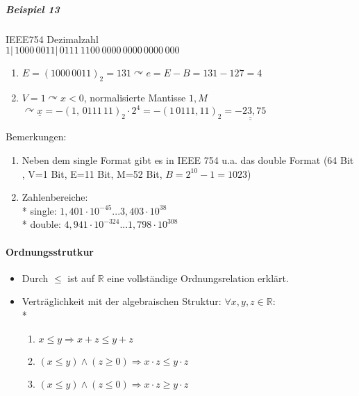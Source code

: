 \documentclass[a4paper]{scrartcl}
\begin{document}
\subparagraph{Beispiel 13} IEEE754 Dezimalzahl\\
$1| \, 1000 \, 0011|\, 0111 \, 1100 \, 0000 \, 0000 \, 0000 \, 000$
\begin{enumerate}
\item $E=(1000 \, 0011)_2 = 131 \curvearrowright e=E-B = 131 - 127=4$
\item $V=1 \curvearrowright x < 0$, normalisierte Mantisse $1,M$\\
$\curvearrowright \underline{x} = -(1,\, 0111 \, 11)_2 \cdot 2^4= -(1 \, 0111, 11)_2 = \underline{\underline{-23,75}}$
\end{enumerate}

Bemerkungen:
\begin{enumerate}
\item Neben dem single Format gibt es in IEEE 754 u.a. das double Format (64 Bit , V=1 Bit, E=11 Bit, M=52 Bit, $B=2^{10} -1 = 1023$)
\item Zahlenbereiche:\\*
single: $1,401 \cdot 10^{-45} ... 3,403 \cdot 10^{38}$\\*
double: $4,941 \cdot 10^{-324} ... 1,798 \cdot 10^{308}$
\end{enumerate}

\paragraph{Ordnungsstrutkur}
\begin{itemize}
\item Durch $\leq$ ist auf $\mathbb{R}$ eine vollständige Ordnungsrelation erklärt.
\item Verträglichkeit mit der algebraischen Struktur: $\forall x,y,z \in \mathbb{R}:$\\*
\begin{enumerate}
\item $x \leq y \Rightarrow x + z \leq y + z$
\item $(x \leq y) \wedge (z \geq 0) \Rightarrow x \cdot z \leq y \cdot z$
\item $(x \leq y) \wedge (z \leq 0 ) \Rightarrow x \cdot z \geq y \cdot z$

\end{enumerate}
\end{itemize}
\end{document}

